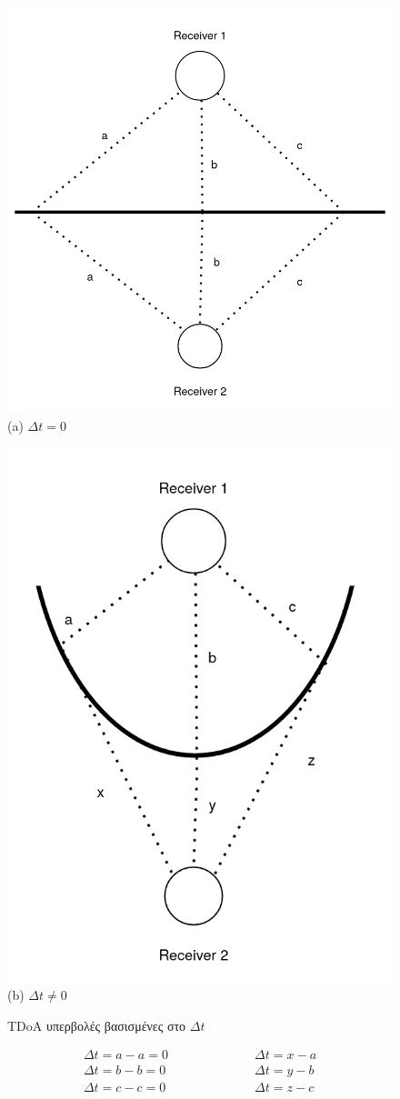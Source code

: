 \begin{figure} [H]
	\centering
    \begin{minipage}{.5\textwidth}
      \centering
      \includegraphics[width=0.6\linewidth]{../Photos/tdoa-dt-0.png}\\
      {(a) $Δt = 0$}
    \end{minipage}%
    \begin{minipage}{.5\textwidth}
      \centering
      \includegraphics[width=0.4\linewidth]{../Photos/tdoa-dt-not-0.png}\\
      {(b) $Δt \neq 0$}
	\end{minipage}
    \hfill \break
    \decoRule
    \caption[TDoA υπερβολές βασισμένες στο $\Delta t$]{TDoA υπερβολές βασισμένες στο $\Delta t$} %
    \label{fig:TDoA-hyberbolas}
\end{figure}
\begin{align}
	\Delta t = a-a = 0 \quad \quad \quad & \quad \quad \quad\Delta t = x-a \nonumber \\
	\Delta t = b-b = 0 \quad \quad \quad & \quad \quad \quad\Delta t = y-b \nonumber \\
	\Delta t = c-c = 0 \quad \quad \quad & \quad \quad \quad\Delta t = z-c \nonumber
\end{align}



